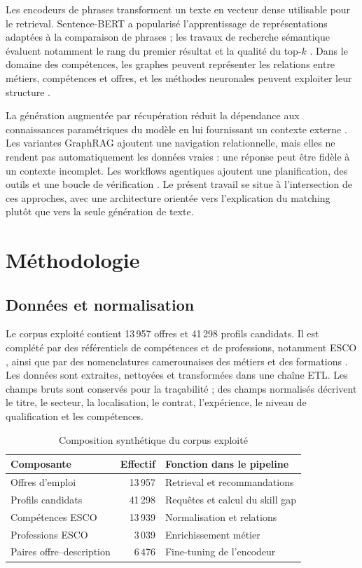 \documentclass[10pt]{article}
\begin{document}
Les encodeurs de phrases transforment un texte en vecteur dense utilisable pour le retrieval. Sentence-BERT a popularisé l'apprentissage de représentations adaptées à la comparaison de phrases \citep{reimers2019sbert}; les travaux de recherche sémantique évaluent notamment le rang du premier résultat et la qualité du top-$k$ \citep{thakur2021beir,muennighoff2022mteb}. Dans le domaine des compétences, les graphes peuvent représenter les relations entre métiers, compétences et offres, et les méthodes neuronales peuvent exploiter leur structure \citep{goyal2023jobxmlc,he2020lightgcn}.

La génération augmentée par récupération réduit la dépendance aux connaissances paramétriques du modèle en lui fournissant un contexte externe \citep{lewis2020rag}. Les variantes GraphRAG ajoutent une navigation relationnelle, mais elles ne rendent pas automatiquement les données vraies : une réponse peut être fidèle à un contexte incomplet. Les workflows agentiques ajoutent une planification, des outils et une boucle de vérification \citep{yao2023react,asai2024selfrag}. Le présent travail se situe à l'intersection de ces approches, avec une architecture orientée vers l'explication du matching plutôt que vers la seule génération de texte.

\section{Méthodologie}
\subsection{Données et normalisation}
Le corpus exploité contient 13\,957 offres et 41\,298 profils candidats. Il est complété par des référentiels de compétences et de professions, notamment ESCO \citep{europeancommission2024esco}, ainsi que par des nomenclatures camerounaises des métiers et des formations \citep{minfop2013ncm}. Les données sont extraites, nettoyées et transformées dans une chaîne ETL. Les champs bruts sont conservés pour la traçabilité ; des champs normalisés décrivent le titre, le secteur, la localisation, le contrat, l'expérience, le niveau de qualification et les compétences.

\begin{table}[ht]
\centering
\caption{Composition synthétique du corpus exploité}
\label{tab:data}
\small
\begin{tabularx}{\linewidth}{>{\raggedright\arraybackslash}X r >{\raggedright\arraybackslash}X}
\toprule
Composante & Effectif & Fonction dans le pipeline \\
\midrule
Offres d'emploi & 13\,957 & Retrieval et recommandations \\
Profils candidats & 41\,298 & Requêtes et calcul du skill gap \\
Compétences ESCO & 13\,939 & Normalisation et relations \\
Professions ESCO & 3\,039 & Enrichissement métier \\
Paires offre--description & 6\,476 & Fine-tuning de l'encodeur \\
\bottomrule
\end{tabularx}
\end{table}
\end{document}
